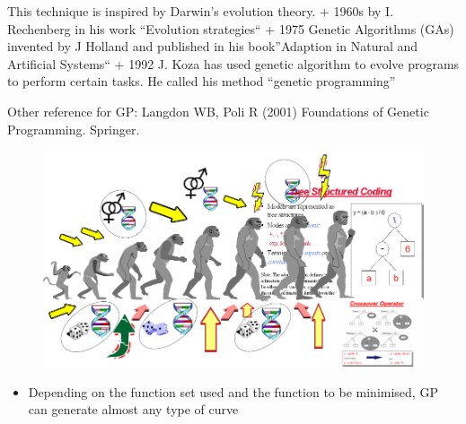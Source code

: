 \documentclass[]{book}
\providecommand{\tightlist}{%
  \setlength{\itemsep}{0pt}\setlength{\parskip}{0pt}}
\begin{document}
This technique is inspired by Darwin's evolution theory. + 1960s by I.
Rechenberg in his work ``Evolution strategies`` + 1975 Genetic
Algorithms (GAs) invented by J Holland and published in his
book''Adaption in Natural and Artificial Systems`` + 1992 J. Koza has
used genetic algorithm to evolve programs to perform certain tasks. He
called his method ``genetic programming''

Other reference for GP: Langdon WB, Poli R (2001) Foundations of Genetic
Programming. Springer.

\begin{figure}[htbp]
\centering
\includegraphics{figures/gpEvolution.png}
\caption{}
\end{figure}

\begin{itemize}
\tightlist
\item
  Depending on the function set used and the function to be minimised,
  GP can generate almost any type of curve
\end{itemize}
\end{document}

